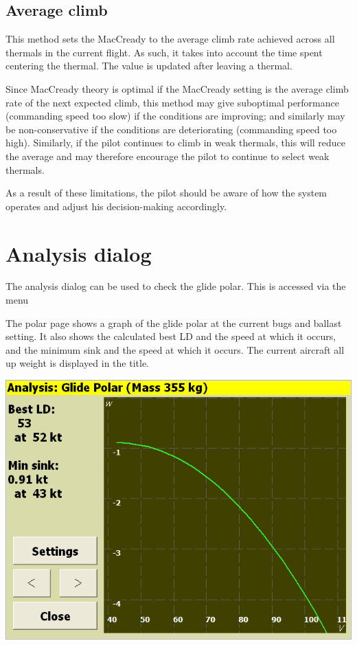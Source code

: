 \documentclass[a4paper,12pt]{refrep}
\begin{document}
\subsection*{Average climb}

This method sets the MacCready to the average climb rate achieved
across all thermals in the current flight.  As such, it takes into
account the time spent centering the thermal.  The value is updated
after leaving a thermal.

Since MacCready theory is optimal if the MacCready setting is the
average climb rate of the next expected climb, this method may give
suboptimal performance (commanding speed too slow) if the conditions
are improving; and similarly may be non-conservative if the conditions
are deteriorating (commanding speed too high).  Similarly, if the pilot
continues to climb in weak thermals, this will reduce the average
and may therefore encourage the pilot to continue to select weak thermals.

As a result of these limitations, the pilot should be aware of how the
system operates and adjust his decision-making accordingly.

\section{Analysis dialog}

The analysis dialog can be used to check the glide polar.  This is
accessed via the menu 
\begin{quote}
\blink{}
\end{quote}

The polar page shows a graph of the glide polar at the current bugs
and ballast setting.  It also shows the calculated best LD and the
speed at which it occurs, and the minimum sink and the speed at which
it occurs.  The current aircraft all up weight is displayed in the
title.

\begin{center}
\includegraphics[angle=0,width=\linewidth,keepaspectratio='true']{figures/analysis-glidepolar.png}
\end{center}
\end{document}
